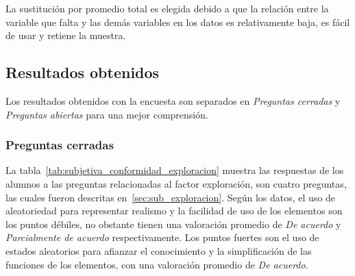 La sustitución por promedio total es elegida debido a que la relación entre la
variable que falta y las demás variables en los datos es relativamente baja, es
fácil de usar y retiene la muestra. 



\subsection{Resultados obtenidos}
\label{sec:res_subjetiva}

Los resultados obtenidos con la encuesta son separados en \emph{Preguntas cerradas} y 
\emph{Preguntas abiertas} para una mejor comprensión.

\subsubsection{Preguntas cerradas}
\newcommand{\matitle}[2]{\parbox{#1}{\raggedright #2}}

La tabla~\ref{tab:subjetiva_conformidad_exploracion} muestra las respuestas de
los alumnos a las preguntas relacionadas al factor exploración, son cuatro
preguntas, las cuales fueron descritas en~\ref{sec:sub_exploracion}. Según los
datos, el uso de aleatoriedad para representar realismo y la facilidad de uso de
los elementos son los puntos débiles, no obstante tienen una valoración promedio
de \emph{De acuerdo} y \emph{Parcialmente de acuerdo} respectivamente. Los
puntos fuertes son el uso de estados aleatorios para afianzar el conocimiento y
la simplificación de las funciones de los elementos, con una valoración promedio
de \emph{De acuerdo}.


